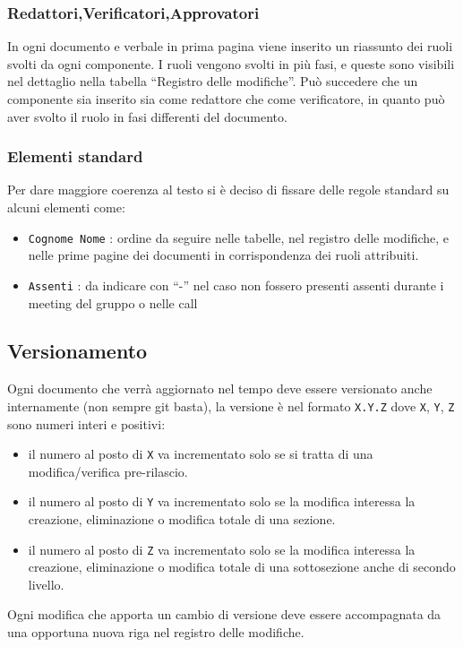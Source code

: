 \subsubsection{Redattori,Verificatori,Approvatori}
In ogni documento e verbale in prima pagina viene inserito un riassunto dei ruoli svolti da ogni componente. I ruoli vengono svolti in più fasi, e queste sono visibili nel dettaglio nella tabella ``Registro delle modifiche''. Può succedere che un componente sia inserito sia come redattore che come verificatore, in quanto può aver svolto il ruolo in fasi differenti del documento.

\subsubsection{Elementi standard}
Per dare maggiore coerenza al testo si è deciso di fissare delle regole standard su alcuni elementi come:
\begin{itemize}
	\item \texttt{Cognome Nome} : ordine da seguire nelle tabelle, nel registro delle modifiche, e nelle prime pagine dei documenti in corrispondenza dei ruoli attribuiti.
	\item \texttt{Assenti} : da indicare con ``-'' nel caso non fossero presenti assenti durante i meeting del gruppo o nelle call
\end{itemize}

\subsection{Versionamento}
Ogni documento che verrà aggiornato nel tempo deve essere versionato anche
internamente (non sempre git basta), la versione è nel formato \texttt{X.Y.Z} dove
\texttt{X}, \texttt{Y}, \texttt{Z} sono numeri interi e positivi:
\begin{itemize}
    \item il numero al posto di \texttt{X} va incrementato solo se si tratta di una
    modifica/verifica pre-rilascio.
    \item il numero al posto di \texttt{Y} va incrementato solo se la modifica
    interessa la creazione, eliminazione o modifica totale di una sezione.
    \item il numero al posto di \texttt{Z} va incrementato solo se la modifica
    interessa la creazione, eliminazione o modifica totale di una sottosezione
    anche di secondo livello.
\end{itemize}
Ogni modifica che apporta un cambio di versione deve essere accompagnata da una
opportuna nuova riga nel registro delle modifiche.
\\

